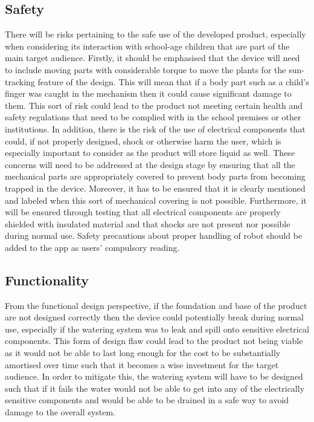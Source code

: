 \documentclass{article}
\begin{document}
\subsection{Safety}
There will be risks pertaining to the safe use of the developed product, especially when considering its interaction with school-age children that are part of the main target audience. Firstly, it should be emphasised that the device will need to include moving parts with considerable torque to move the plants for the sun-tracking feature of the design. This will mean that if a body part such as a child’s finger was caught in the mechanism then it could cause significant damage to them. This sort of risk could lead to the product not meeting certain health and safety regulations that need to be complied with in the school premises or other institutions. In addition, there is the risk of the use of electrical components that could, if not properly designed, shock or otherwise harm the user, which is especially important to consider as the product will store liquid as well. These concerns will need to be addressed at the design stage by ensuring that all the mechanical parts are appropriately covered to prevent body parts from becoming trapped in the device. Moreover, it has to be ensured that it is clearly mentioned and labeled when this sort of mechanical covering is not possible. Furthermore, it will be ensured through testing that all electrical components are properly shielded with insulated material and that shocks are not present nor possible during normal use. Safety precautions about proper handling of robot should be added to the app as users' compulsory reading.

\subsection{Functionality}
From the functional design perspective, if the foundation and base of the product are not designed correctly then the device could potentially break during normal use, especially if the watering system was to leak and spill onto sensitive electrical components. This form of design flaw could lead to the product not being viable as it would not be able to last long enough for the cost to be substantially amortised over time such that it becomes a wise investment for the target audience. In order to mitigate this, the watering system will have to be designed such that if it fails the water would not be able to get into any of the electrically sensitive components and would be able to be drained in a safe way to avoid damage to the overall system.
\end{document}
